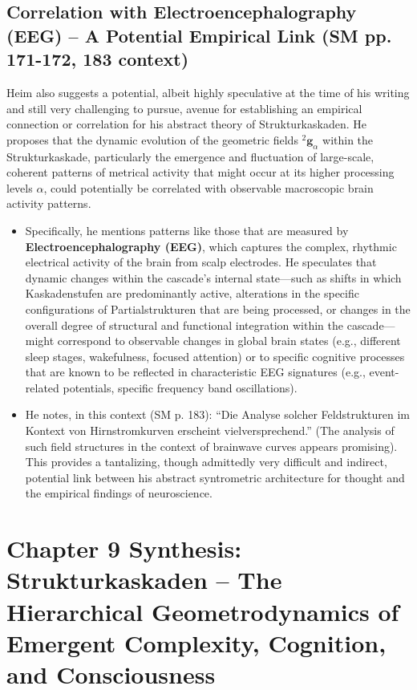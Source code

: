 \documentclass[
    12pt,              %
    a4paper,           %
    headings=normal,   %
    twoside=true,      %
    BCOR=8mm,          %
]{scrbook}
\newcommand{\q}[1]{\enquote{#1}}
\newcommand{\kompositionsfeld}{{}^2\mathbf{g}}
\newcommand{\kaskadenstufe}{\alpha}
\begin{document}
\subsection{Correlation with Electroencephalography (EEG) – A Potential Empirical Link (SM pp. 171-172, 183 context)}
\label{sec:ch9_4_4_eeg_correlation}
Heim also suggests a potential, albeit highly speculative at the time of his writing and still very challenging to pursue, avenue for establishing an empirical connection or correlation for his abstract theory of Strukturkaskaden. He proposes that the dynamic evolution of the geometric fields \(\kompositionsfeld_\alpha\) within the Strukturkaskade, particularly the emergence and fluctuation of large-scale, coherent patterns of metrical activity that might occur at its higher processing levels \(\kaskadenstufe\), could potentially be correlated with observable macroscopic brain activity patterns.
\begin{itemize}
    \item   Specifically, he mentions patterns like those that are measured by \textbf{Electroencephalography (EEG)}, which captures the complex, rhythmic electrical activity of the brain from scalp electrodes. He speculates that dynamic changes within the cascade’s internal state—such as shifts in which Kaskadenstufen are predominantly active, alterations in the specific configurations of Partialstrukturen that are being processed, or changes in the overall degree of structural and functional integration within the cascade—might correspond to observable changes in global brain states (e.g., different sleep stages, wakefulness, focused attention) or to specific cognitive processes that are known to be reflected in characteristic EEG signatures (e.g., event-related potentials, specific frequency band oscillations).
    \item   He notes, in this context (SM p. 183): \q{Die Analyse solcher Feldstrukturen im Kontext von Hirnstromkurven erscheint vielversprechend.} (The analysis of such field structures in the context of brainwave curves appears promising). This provides a tantalizing, though admittedly very difficult and indirect, potential link between his abstract syntrometric architecture for thought and the empirical findings of neuroscience.
\end{itemize}

\section{Chapter 9 Synthesis: Strukturkaskaden – The Hierarchical Geometrodynamics of Emergent Complexity, Cognition, and Consciousness}
\label{sec:ch9_5_synthesis}
\end{document}
